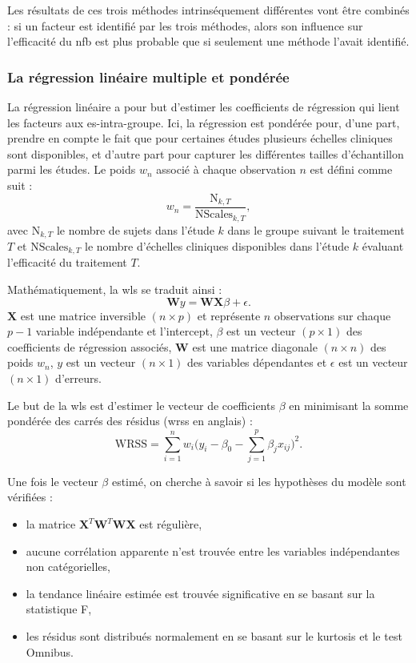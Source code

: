 Les résultats de ces trois méthodes intrinséquement différentes vont être combinés : si un facteur est identifié par les trois méthodes, alors son influence sur l'efficacité du 
\gls{nfb} est plus probable que si seulement une méthode l'avait identifié. 

\subsubsection{La régression linéaire multiple et pondérée}
La régression linéaire a pour but d'estimer les coefficients de régression qui lient les facteurs aux \gls{es}-intra-groupe. Ici, la régression est pondérée pour, d'une part, 
prendre en compte le fait que pour certaines études plusieurs échelles cliniques sont disponibles, et d'autre part pour capturer les différentes tailles d'échantillon parmi les études.
Le poids $w_{n}$ associé à chaque observation $n$ est défini comme suit : 
\begin{equation}
\label{eq:weight_WLS}
w_{n} = \frac{\text{N}_{k,T}}{\text{NScales}_{k,T}},
\end{equation} 
avec $\text{N}_{k,T}$ le nombre de sujets dans l'étude $k$ dans le groupe suivant le traitement $T$ et $\text{NScales}_{k,T}$ le nombre 
d'échelles cliniques disponibles dans l'étude $k$ évaluant l'efficacité du traitement $T$.

Mathématiquement, la \gls{wls} se traduit ainsi : 
\begin{equation}
\label{eq:factors_model_WLS}
\textbf{W}y = \textbf{WX}\beta + \epsilon.
\end{equation}
$\textbf{X}$ est une matrice inversible $(n \times p)$ et représente $n$ observations sur chaque $p-1$ variable indépendante et l'intercept, 
$\beta$ est un vecteur $(p \times 1)$ des coefficients de régression associés, $\textbf{W}$ est une matrice diagonale $(n \times n)$  
des poids $w_{n}$, $y$ est un vecteur $(n \times 1)$ des variables dépendantes et $\epsilon$ est un vecteur $(n \times 1)$ d'erreurs.

Le but de la \gls{wls} est d'estimer le vecteur de coefficients $\beta$ en minimisant la somme pondérée des carrés des résidus (\gls{wrss} en anglais) :
\begin{equation}
\label{eq:factors_WRSS}
\text{WRSS} = \sum_{i=1}^{n} w_i \Big(y_i - \beta_{0} - \sum_{j=1}^{p}\beta_{j}x_{ij}\Big)^2.
\end{equation}

Une fois le vecteur $\beta$ estimé, on cherche à savoir si les hypothèses du modèle sont vérifiées : 
\begin{itemize}
	\item la matrice ${\textbf{X}}^{T}\textbf{W}^{T}\textbf{WX}$ est régulière,
  \item aucune corrélation apparente n'est trouvée entre les variables indépendantes non catégorielles, 
  \item la tendance linéaire estimée est trouvée significative en se basant sur la statistique F,
  \item les résidus sont distribués normalement en se basant sur le kurtosis et le test Omnibus.
\end{itemize} 

